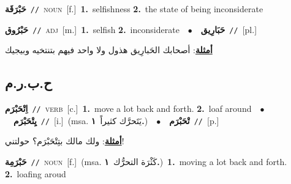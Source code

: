 \documentclass[10pt,a4paper,twoside]{article} %
\begin{document}
\begin{multicols}{2}
{{\setlength\topsep{0pt}\textbf{\foreignlanguage{arabic}{حَبْرَقَة}}\ {\color{gray}\texttt{//}\color{black}}\ \textsc{noun}\ [f.]\ \textbf{1.}~selfishness  \textbf{2.}~the state of being inconsiderate\ 

{\setlength\topsep{0pt}\textbf{\foreignlanguage{arabic}{حَبْرُوق}}\ {\color{gray}\texttt{//}\color{black}}\ \textsc{adj}\ [m.]\ \textbf{1.}~selfish  \textbf{2.}~inconsiderate\ \ $\bullet$\ \ \setlength\topsep{0pt}\textbf{\foreignlanguage{arabic}{حَبَارِيق}}\ {\color{gray}\texttt{//}\color{black}}\ [pl.]\  \begin{flushright}\color{gray}\foreignlanguage{arabic}{\textbf{\underline{\foreignlanguage{arabic}{أمثلة}}}: أصحابك الحَبارِيق هذول ولا واحد فيهم بتنتخيه وبيجيك}\end{flushright}\color{black}} \vspace{2mm}

\vspace{-3mm}
\subsection*{\color{blue}\foreignlanguage{arabic}{ح.ب.ر.م}\color{blue}{}} 

{\setlength\topsep{0pt}\textbf{\foreignlanguage{arabic}{اِتْحَبْرَم}}\ {\color{gray}\texttt{//}\color{black}}\ \textsc{verb}\ [c.]\ \textbf{1.}~move a lot back and forth.  \textbf{2.}~loaf around\ \ $\bullet$\ \ \setlength\topsep{0pt}\textbf{\foreignlanguage{arabic}{يِتْحَبْرَم}}\ {\color{gray}\texttt{//}\color{black}}\ [i.]\ \color{gray}(msa. \foreignlanguage{arabic}{يَتَحرَّك كثيراً}~\foreignlanguage{arabic}{\textbf{١.}})\color{black}\ \ $\bullet$\ \ \setlength\topsep{0pt}\textbf{\foreignlanguage{arabic}{تْحَبْرَم}}\ {\color{gray}\texttt{//}\color{black}}\ [p.]\  \begin{flushright}\color{gray}\foreignlanguage{arabic}{\textbf{\underline{\foreignlanguage{arabic}{أمثلة}}}: ولك مالك بتِتْحَبْرَم؟ حولتني!}\end{flushright}\color{black}} \vspace{2mm}

{\setlength\topsep{0pt}\textbf{\foreignlanguage{arabic}{حَبْرَمِة}}\ {\color{gray}\texttt{//}\color{black}}\ \textsc{noun}\ [f.]\ \color{gray}(msa. \foreignlanguage{arabic}{كَثْرَة التحرُّك}~\foreignlanguage{arabic}{\textbf{١.}})\color{black}\ \textbf{1.}~moving a lot back and forth.  \textbf{2.}~loafing aroud\ 

}}}
\end{multicols}
\end{document}
